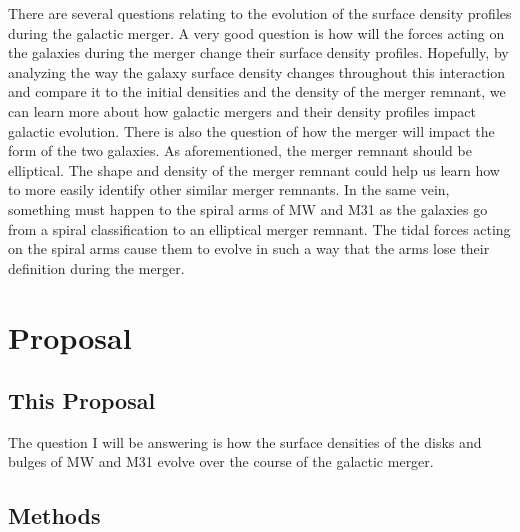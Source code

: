 \documentclass[linenumbers,trackchanges]{aastex7}
\begin{document}
There are several questions relating to the evolution of the surface density
profiles during the galactic merger. A very good question is how will the
forces acting on the galaxies during the merger change their surface density
profiles. Hopefully, by analyzing the way the galaxy surface density changes
throughout this interaction and compare it to the initial densities and the
density of the merger remnant, we can learn more about how galactic mergers
and their density profiles impact galactic evolution. There is also the
question of how the merger will impact the form of the two galaxies. As
aforementioned, the merger remnant should be elliptical. The shape and density
of the merger remnant could help us learn how to more easily identify other
similar merger remnants. In the same vein, something must happen to the spiral
arms of MW and M31 as the galaxies go from a spiral classification to an
elliptical merger remnant. The tidal forces acting on the spiral arms cause
them to evolve in such a way that the arms lose their definition during the
merger.

\section{Proposal} \label{sec:style}

\subsection{This Proposal}

The question I will be answering is how the surface densities of the disks and bulges of MW and M31 evolve over the course of the galactic merger.

\subsection{Methods}
\end{document}
